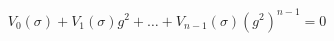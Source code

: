 \begin{equation}  \label{30}
V_{0}(\sigma)+V_{1}(\sigma)g^{2}+\ldots+V_{n-1}(\sigma)\left(g^{2}%
\right)^{n-1}=0
\end{equation}

